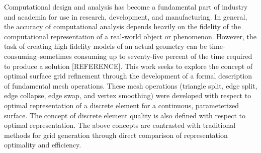 Computational design and analysis has become a fundamental part of
industry and academia for use in research, development, and
manufacturing. In general, the accuracy of computational analysis
depends heavily on the fidelity of the computational representation of a
real-world object or phenomenon. However, the task of creating high
fidelity models of an actual geometry can be time-consuming--sometimes
consuming up to seventy-five percent of the time required to produce a
solution [REFERENCE]. This work seeks to explore the concept of optimal
surface grid refinement through the development of a formal description
of fundamental mesh operations. These mesh operations (triangle split,
edge split, edge collapse, edge swap, and vertex smoothing) were
developed with respect to optimal representation of a discrete element
for a continuous, parameterized surface. The concept of discrete element
quality is also defined with respect to optimal representation. The
above concepts are contrasted with traditional methods for grid
generation through direct comparison of representation optimality and
efficiency.
